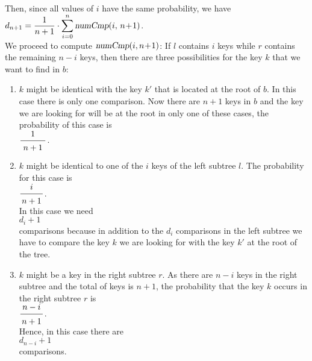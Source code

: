 \\[0.2cm]
Then, since all values of $i$ have the same probability, we have
\\[0.2cm]
\hspace*{1.3cm}
$\displaystyle d_{n+1} =  \frac{1}{n+1} \cdot \sum\limits_{i=0}^n \textsl{numCmp}(i,\, n\!+\!1)$.
\\[0.2cm]
We proceed to compute $\textsl{numCmp}(i,n\!+\!1)$:
If  $l$ contains $i$ keys while $r$ contains the remaining $n-i$ keys,
then there are three possibilities for the key $k$ that we want to find in $b$:
\begin{enumerate}
\item $k$ might be identical with the key $k'$ that is located at the root of $b$.
      In this case there is only one comparison.
      Now there  are $n+1$ keys in $b$ and the key we are looking for will be at the root in only
      one of these cases, the probability of this case is
      \\[0.2cm]
      \hspace*{1.3cm} $\bruch{1}{\,n+1\,}$.

\item $k$ might be identical to one of the  $i$ keys of the left subtree $l$.
      The probability for this case is 
      \\[0.2cm]
      \hspace*{1.3cm} $\displaystyle\bruch{i}{n+1}$. \\[0.2cm]
      In this case we need 
      \\[0.2cm]
      \hspace*{1.3cm} $\displaystyle d_i + 1$ \\[0.2cm]
      comparisons because in addition to the  $d_i$ comparisons in the left subtree we have to
      compare the key $k$ we are looking for with the key $k'$ at the root of the tree.
\item $k$ might be a key in the right subtree $r$.  As there are  $n-i$ keys in the right subtree
      and the total of keys is $n+1$, the probability that the key  $k$ occurs in the right subtree $r$
      is \\[0.2cm]
      \hspace*{1.3cm} $\displaystyle \bruch{n-i}{n+1}$. \\[0.2cm]
      Hence, in this case there are  \\[0.2cm]
      \hspace*{1.3cm} $\displaystyle d_{n-i} + 1$ \\[0.2cm]
      comparisons. 
\end{enumerate}
